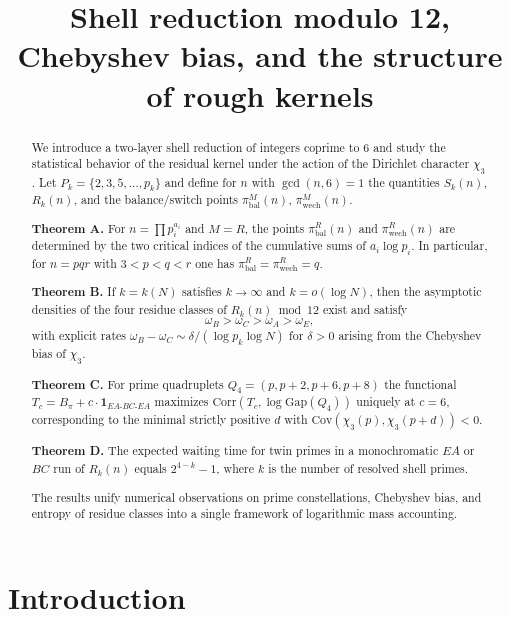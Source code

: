 \documentclass{article}
\title{Shell reduction modulo 12, Chebyshev bias, and the structure of rough kernels}
\author{}
\date{}
\theoremstyle{definition}
\newcommand{\Cov}{\mathrm{Cov}}
\newcommand{\Corr}{\mathrm{Corr}}
\newcommand{\one}{\mathbf{1}}
\begin{document}
	\maketitle
	
	\begin{abstract}
		We introduce a two-layer shell reduction of integers coprime to 6 and study the statistical behavior of the residual kernel under the action of the Dirichlet character $\chi_3$. Let $P_k=\{2,3,5,\dots,p_k\}$ and define for $n$ with $\gcd(n,6)=1$ the quantities $S_k(n)$, $R_k(n)$, and the balance/switch points $\pi_{\mathrm{bal}}^M(n)$, $\pi_{\mathrm{wech}}^M(n)$.
		
		\textbf{Theorem A.} For $n=\prod p_i^{a_i}$ and $M=R$, the points $\pi_{\mathrm{bal}}^R(n)$ and $\pi_{\mathrm{wech}}^R(n)$ are determined by the two critical indices of the cumulative sums of $a_i\log p_i$. In particular, for $n=pqr$ with $3<p<q<r$ one has $\pi_{\mathrm{bal}}^R=\pi_{\mathrm{wech}}^R=q$.
		
		\textbf{Theorem B.} If $k=k(N)$ satisfies $k\to\infty$ and $k=o(\log N)$, then the asymptotic densities of the four residue classes of $R_k(n)\bmod 12$ exist and satisfy
		\[
		\omega_B > \omega_C > \omega_A > \omega_E,
		\]
		with explicit rates $\omega_B-\omega_C \sim \delta/(\log p_k\log N)$ for $\delta>0$ arising from the Chebyshev bias of $\chi_3$.
		
		\textbf{Theorem C.} For prime quadruplets $Q_4=(p,p+2,p+6,p+8)$ the functional $T_c=B_\pi + c\cdot \one_{EA\text{-}BC\text{-}EA}$ maximizes $\Corr(T_c,\log\mathrm{Gap}(Q_4))$ uniquely at $c=6$, corresponding to the minimal strictly positive $d$ with $\Cov(\chi_3(p),\chi_3(p+d))<0$.
		
		\textbf{Theorem D.} The expected waiting time for twin primes in a monochromatic $EA$ or $BC$ run of $R_k(n)$ equals $2^{4-k}-1$, where $k$ is the number of resolved shell primes.
		
		The results unify numerical observations on prime constellations, Chebyshev bias, and entropy of residue classes into a single framework of logarithmic mass accounting.
	\end{abstract}
	
	\section{Introduction}
	
\end{document}
